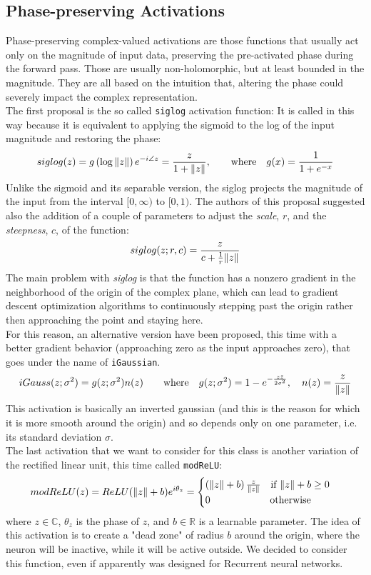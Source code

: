 \documentclass[../main.tex]{subfiles}
\begin{document}
\subsection*{Phase-preserving Activations}
Phase-preserving complex-valued activations are those functions that usually act only on the magnitude of input data, preserving the pre-activated phase during the forward pass. Those are usually non-holomorphic, but at least bounded in the magnitude. They are all based on the intuition that, altering the phase could severely impact the complex representation.\\
The first proposal is the so called \texttt{siglog} activation function:
It is called in this way because it is equivalent to applying the sigmoid to the log of the input magnitude and restoring the phase:
\[ siglog(z) = g\left(\log\norm{z}\right)e^{-i\angle z}= \frac{z}{1+\norm{z}}, \qquad\text{where}\quad g(x) = \frac{1}{1+e^{-x}} \]
Unlike the sigmoid and its separable version, the siglog projects the magnitude of the input from the interval $[0, \infty)$ to $[0,1)$. The authors of this proposal suggested also the addition of a couple of parameters to adjust the \textit{scale}, $r$, and the \textit{steepness}, $c$, of the function:
\[ siglog(z; r,c) = \frac{z}{c + \frac{1}{r}\norm{z}} \]
The main problem with \textit{siglog} is that the function has a nonzero gradient in the neighborhood of the origin of the complex plane, which can lead to gradient descent optimization algorithms
to continuously stepping past the origin rather then approaching the point and staying here.\\
For this reason, an alternative version have been proposed, this time with a better gradient behavior (approaching zero as the input approaches zero), that goes under the name of \texttt{iGaussian}.
\[ iGauss(z;\sigma^2)=g(z;\sigma^2)n(z) \qquad\text{where}\quad g(z;\sigma^2)=1-e^{-\frac{z\bar{z}}{2\sigma^2}},\quad n(z) = \frac{z}{\norm{z}} \]
This activation is basically an inverted gaussian (and this is the reason for which it is more smooth around the origin) and so depends only on one parameter, i.e. its standard deviation $\sigma$.\\
The last activation that we want to consider for this class is another variation of the rectified linear unit, this time called \texttt{modReLU}:
\[ modReLU(z) = ReLU(\norm{z} + b)e^{i\theta_z} = \begin{cases} \left(\norm{z}+b\right)\frac{z}{\norm{z}}\quad\text{if }\norm{z}+b\ge 0 \\ 0\qquad\qquad\qquad\text{otherwise} \end{cases} \]
where $z\in\mathds{C}$, $\theta_z$ is the phase of $z$, and $b\in\mathds{R}$ is a learnable parameter. The idea of this activation is to create a "dead zone" of radius $b$ around the origin, where the neuron will be inactive, while it will be active outside. We decided to consider this function, even if apparently was designed for Recurrent neural networks.
\end{document}
